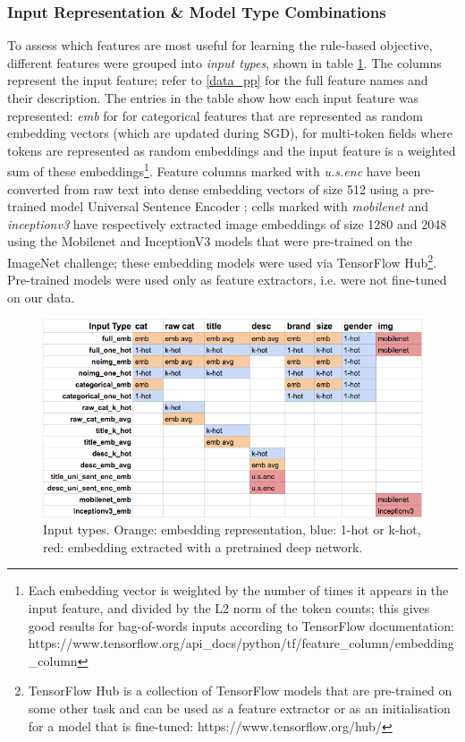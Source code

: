 \subsubsection{Input Representation \& Model Type Combinations}
\label{model_comb}

To assess which features are most useful for learning the rule-based objective, different features were grouped into \textit{input types}, shown in table \ref{input_types}.
The columns represent the input feature; refer to \ref{data_pp} for the full feature names and their description.
The entries in the table show how each input feature was represented: \textit{emb} for for categorical features that are represented as random embedding vectors (which are updated during SGD),  for multi-token fields where tokens are represented as random embeddings and the input feature is a weighted sum of these embeddings\footnote{Each embedding vector is weighted by the number of times it appears in the input feature, and divided by the L2 norm of the token counts; this gives good results for bag-of-words inputs according to TensorFlow documentation:
\newline
https://www.tensorflow.org/api\_docs/python/tf/feature\_column/embedding\_column}.
Feature columns marked with \textit{u.s.enc} have been converted from raw text into dense embedding vectors of size 512 using a pre-trained model Universal Sentence Encoder \cite{uni_sent_enc}; cells marked with \textit{mobilenet} and \textit{inceptionv3} have respectively extracted image embeddings of size 1280 and 2048 using the Mobilenet \cite{mobilenet} and InceptionV3 \cite{inceptionv3} models that were pre-trained on the ImageNet challenge; these embedding models were used via TensorFlow Hub\footnote{TensorFlow Hub is a collection of TensorFlow models that are pre-trained on some other task and can be used as a feature extractor or as an initialisation for a model that is fine-tuned: https://www.tensorflow.org/hub/}.
Pre-trained models were used only as feature extractors, i.e. were not fine-tuned on our data.

\begin{figure}
  \centering
  \includegraphics[width=\linewidth]{figures/input_types}
  \caption{Input types. Orange: embedding representation, blue: 1-hot or k-hot, red: embedding extracted with a pretrained deep network.}
  \label{input_types}
\end{figure}

